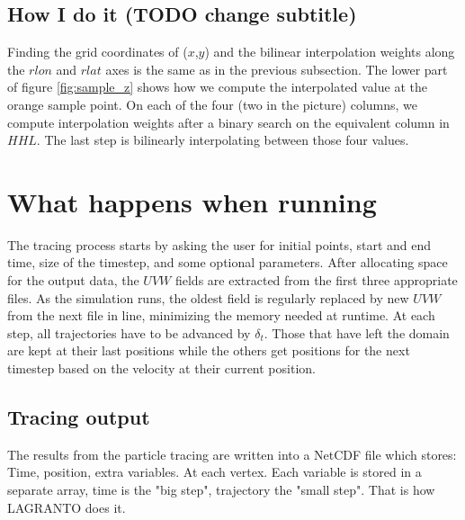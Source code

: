 \subsection{How I do it (TODO change subtitle)}
Finding the grid coordinates of ($x$,$y$) and the bilinear interpolation weights along the $rlon$ and $rlat$ axes is the same as in the previous subsection.%
The lower part of figure \ref{fig:sample_z} shows how we compute the interpolated value at the orange sample point. On each of the four (two in the picture) columns, we compute interpolation weights after a binary search on the equivalent column in $HHL$. The last step is bilinearly interpolating between those four values.%

\section{What happens when running}
The tracing process starts by asking the user for initial points, start and end time, size of the timestep, and some optional parameters. After allocating space for the output data, the $UVW$ fields are extracted from the first three appropriate files. As the simulation runs, the oldest field is regularly replaced by new $UVW$ from the next file in line, minimizing the memory needed at runtime.
At each step, all trajectories have to be advanced by $\delta_t$. Those that have left the domain are kept at their last positions while the others get positions for the next timestep based on the velocity at their current position.
\subsection{Tracing output}
The results from the particle tracing are written into a NetCDF file which stores: Time, position, extra variables. At each vertex.
Each variable is stored in a separate array, time is the "big step", trajectory the "small step".
That is how LAGRANTO does it.


